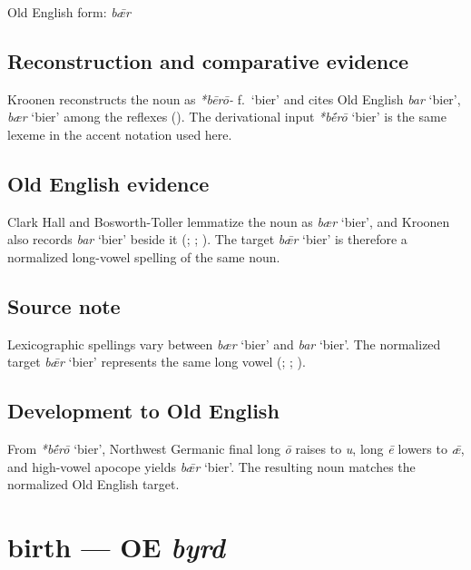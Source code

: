 \documentclass[
  british,
  a4paper,
  openany]{book}
\providecommand{\Recon}[1]{\emph{*#1}}
{\catcode`→=\active \global\def→{\ensuremath{\rightarrow}}}
\providecommand{\texorpdfstring}[2]{#1}
\providecommand{\Recon}[1]{\emph{*#1}}
{\catcode`→=\active \global\def→{\ensuremath{\rightarrow}}}
\begin{document}
Old English form: \emph{bǣr}

\subsection{Reconstruction and comparative
evidence}\label{reconstruction-and-comparative-evidence-4}

Kroonen reconstructs the noun as {\emph{*bērō-}} f.~`bier' and cites Old
English {\emph{bar}} `bier', {\emph{bær}} `bier' among the reflexes
(). The derivational input
{\Recon{bḗrō} `bier'} is the same lexeme in the accent notation used
here.

\subsection{Old English evidence}\label{old-english-evidence-4}

Clark Hall and Bosworth-Toller lemmatize the noun as {\emph{bær}}
`bier', and Kroonen also records {\emph{bar}} `bier' beside it
(;
;
). The target {\emph{bǣr}}
`bier' is therefore a normalized long-vowel spelling of the same noun.

\subsection{Source note}\label{source-note}

Lexicographic spellings vary between {\emph{bær}} `bier' and
{\emph{bar}} `bier'. The normalized target {\emph{bǣr}} `bier'
represents the same long vowel (; ;
).

\subsection{Development to Old
English}\label{development-to-old-english-4}

From {\Recon{bḗrō} `bier'}, Northwest Germanic final long \emph{ō}
raises to \emph{u}, long \emph{ē} lowers to \emph{ǣ}, and high-vowel
apocope yields {\emph{bǣr}} `bier'. The resulting noun matches the
normalized Old English target.

\section{\texorpdfstring{birth --- OE
\emph{byrd}}{birth --- OE byrd}}\label{birth-oe-byrd}
\end{document}
